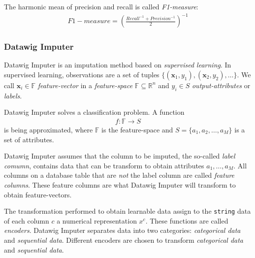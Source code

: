 The harmonic mean of precision and recall is called \emph{F1-measure}:
\begin{align}
F1-measure = {\left(\frac{Recall^{-1} + Precision^{-1}}{2}\right)}^{-1}
\end{align}

\subsubsection{Datawig Imputer}
Datawig Imputer is an imputation method based on \emph{supervised learning}.
In supervised learning, observations are a set of tuples \( \{\left(\mathbold{x}_1, y_1\right),\left(\mathbold{x}_2, y_2\right), \dots \} \).
We call \( \mathbold{x}_i \in \mathbb{F}\) \emph{feature-vector} in a \emph{feature-space} \( \mathbb{F} \subseteq \mathbb{R}^{n} \) and \( y_i \in S \) \emph{output-attributes} or \emph{labels}.\cite[p.19]{DUD00}

Datawig Imputer solves a classification problem.
A function
\begin{align}
    f: \mathbb{F} \rightarrow S
\end{align}
is being approximated, where \( \mathbb{F} \) is the feature-space and \( S = \{a_1, a_2, \dots, a_M \} \) is a set of attributes.

Datawig Imputer assumes that the column to be imputed, the so-called \emph{label comumn}, contains data that can be transform to obtain attributes \( a_1, \dots, a_M \).\cite[p.2]{BIE18}
All columns on a database table that are \emph{not} the label column are called \emph{feature columns}.
These feature columns are what Datawig Imputer will transform to obtain feature-vectors.

The transformation performed to obtain learnable data assign to the \texttt{string} data of each column \( c \) a numerical representation \( x^c \).
These functions are called \emph{encoders}.
Datawig Imputer separates data into two categories: \emph{categorical data} and \emph{sequential data}.
Different encoders are chosen to transform \emph{categorical data} and \emph{sequential data}.

